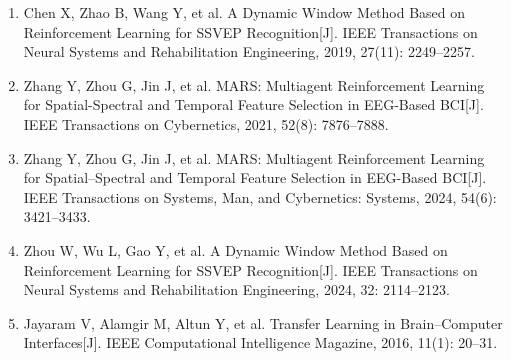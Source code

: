 \documentclass[12pt,a4paper]{ctexart}
\begin{document}
\begin{enumerate}
  \item Chen X, Zhao B, Wang Y, et al. A Dynamic Window Method Based on Reinforcement Learning for SSVEP Recognition[J]. IEEE Transactions on Neural Systems and Rehabilitation Engineering, 2019, 27(11): 2249--2257.
  \item Zhang Y, Zhou G, Jin J, et al. MARS: Multiagent Reinforcement Learning for Spatial-Spectral and Temporal Feature Selection in EEG-Based BCI[J]. IEEE Transactions on Cybernetics, 2021, 52(8): 7876--7888.
  \item Zhang Y, Zhou G, Jin J, et al. MARS: Multiagent Reinforcement Learning for Spatial--Spectral and Temporal Feature Selection in EEG-Based BCI[J]. IEEE Transactions on Systems, Man, and Cybernetics: Systems, 2024, 54(6): 3421--3433.
  \item Zhou W, Wu L, Gao Y, et al. A Dynamic Window Method Based on Reinforcement Learning for SSVEP Recognition[J]. IEEE Transactions on Neural Systems and Rehabilitation Engineering, 2024, 32: 2114--2123.
  \item Jayaram V, Alamgir M, Altun Y, et al. Transfer Learning in Brain--Computer Interfaces[J]. IEEE Computational Intelligence Magazine, 2016, 11(1): 20--31.
\end{enumerate}

\end{document}
